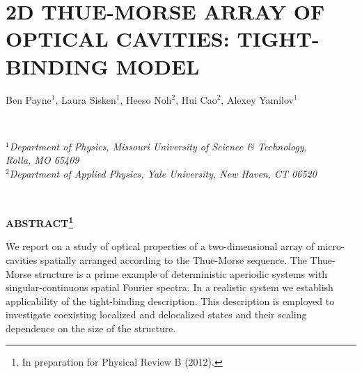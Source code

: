 % 
% 
% 
% 
\chapter{2D THUE-MORSE ARRAY OF OPTICAL CAVITIES: TIGHT-BINDING MODEL}
\label{eq:TM_physics}
\label{paper:6_start}

% 
\begin{center}
Ben Payne$^1$, Laura Sisken$^1$, Heeso Noh$^2$, Hui Cao$^2$, Alexey Yamilov$^1$                                                                               \end{center}

\ \\
\begin{center}
\textit{$^1$Department of Physics, Missouri University of Science \& Technology,\\ Rolla, MO 65409\\
$^2$Department of Applied Physics, Yale University, New Haven, CT 06520}\end{center}

\ \\
% 
% 
\begin{center}\textbf{ABSTRACT\footnote{In preparation for Physical Review B (2012).}}\end{center}

We report on a study of optical properties of a two-dimensional array of micro-cavities spatially arranged according to the Thue-Morse sequence. The Thue-Morse structure is a prime example of deterministic aperiodic systems with singular-continuous spatial Fourier spectra. In a realistic system we establish applicability of the tight-binding description. This description is employed to investigate coexisting localized and delocalized states and their scaling dependence on the size of the structure.
% 
% 

